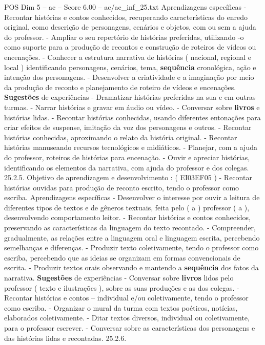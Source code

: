 \begin{textsample}{POS Dim 5 – ac – Score 6.00 – ac/ac\_inf\_25.txt}
Aprendizagens específicas - Recontar histórias e contos conhecidos, recuperando características do enredo original, como descrição de personagens, cenários e objetos, com ou sem a ajuda do professor. - Ampliar o seu repertório de histórias preferidas, utilizando -o como suporte para a produção de recontos e construção de roteiros de vídeos ou encenações. - Conhecer a estrutura narrativa de histórias ( nacional, regional e local ) identificando personagens, cenários, tema, \textbf{sequência} cronológica, ação e intenção dos personagens. - Desenvolver a criatividade e a imaginação por meio da produção de reconto e planejamento de roteiro de vídeos e encenações. \textbf{Sugestões} de experiências - Dramatizar histórias preferidas na sua e em outras turmas. - Narrar histórias e gravar em áudio ou vídeo. - Conversar sobre \textbf{livros} e histórias lidas. - Recontar histórias conhecidas, usando diferentes entonações para criar efeitos de suspense, imitação da voz dos personagens e outros. - Recontar histórias conhecidas, aproximando o relato da história original. - Recontar histórias manuseando recursos tecnológicos e midiáticos. - Planejar, com a ajuda do professor, roteiros de histórias para encenação. - Ouvir e apreciar histórias, identificando os elementos da narrativa, com ajuda do professor e dos colegas. 25.2.5.
Objetivo de aprendizagem e desenvolvimento : ( EI03EF05 ) - Recontar histórias ouvidas para produção de reconto escrito, tendo o professor como escriba.
Aprendizagens específicas - Desenvolver o interesse por ouvir a leitura de diferentes tipos de textos e de gêneros textuais, feita pelo ( a ) professor ( a ), desenvolvendo comportamento leitor. - Recontar histórias e contos conhecidos, preservando as características da linguagem do texto recontado. - Compreender, gradualmente, as relações entre a linguagem oral e linguagem escrita, percebendo semelhanças e diferenças. - Produzir texto coletivamente, tendo o professor como escriba, percebendo que as ideias se organizam em formas convencionais de escrita. - Produzir textos orais observando e mantendo a \textbf{sequência} dos fatos da narrativa. \textbf{Sugestões} de experiências - Conversar sobre \textbf{livros} lidos pelo professor ( texto e ilustrações ), sobre as suas produções e as dos colegas. - Recontar histórias e contos – individual e/ou coletivamente, tendo o professor como escriba. - Organizar o mural da turma com textos poéticos, notícias, elaborados coletivamente. - Ditar textos diversos, individual ou coletivamente, para o professor escrever. - Conversar sobre as características dos personagens e das histórias lidas e recontadas. 25.2.6.

\end{textsample}
